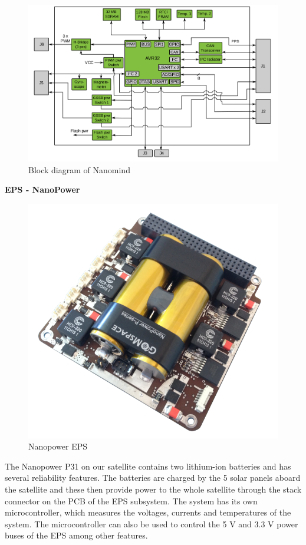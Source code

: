 \documentclass[english,12pt,a4paper,pdftex,elec,utf8]{aaltothesis}
\begin{document}
\begin{figure}[h!]
\caption{Block diagram of Nanomind}
\includegraphics[scale=0.4]{nanomind_block}
\end{figure}
\par
\textbf{EPS - NanoPower}\par
\begin{figure}[h!]
\caption{Nanopower EPS}
\includegraphics[scale=0.2]{nanopower}
\end{figure}
The Nanopower P31 on our satellite contains two lithium-ion batteries and has several reliability features. The batteries are charged by the 5 solar panels aboard the satellite and these then provide power to the whole satellite through the stack connector on the PCB of the EPS subsystem. The system has its own microcontroller, which measures the voltages, currents and temperatures of the system. The microcontroller can also be used to control the 5 V and 3.3 V power buses of the EPS among other features.\par
\end{document}
